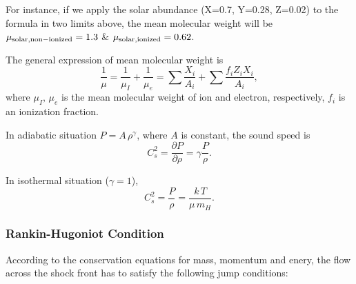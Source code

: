 For instance, if we apply the solar abundance (X=0.7, Y=0.28, Z=0.02) to the formula in two limits above,
the mean molecular weight will be $\mu_{\rm solar,non-ionized}=1.3$ \& $\mu_{\rm solar,ionized} =0.62$.

The general expression of mean molecular weight is
\begin{equation}
    \frac{1}{\mu} = \frac{1}{\mu_{I}} + \frac{1}{\mu_{e}} = \sum\frac{X_{i}}{A_{i}} + \sum\frac{f_{i}Z_{i}X_{i}}{A_{i}},
\end{equation}
where $\mu_{I},\,\mu_{e}$ is the mean molecular weight of ion and electron, respectively, $f_{i}$ is an ionization fraction.


\medskip
{}

In adiabatic situation $P = A\, \rho^{\gamma}$, where $A$ is constant, the sound speed is
\begin{equation}
    C_{s}^{2} = \frac{\partial P}{\partial \rho} = \gamma \frac{P}{\rho}.
\end{equation}

In isothermal situation ($\gamma=1$),
\begin{equation}
    C_{s}^{2} = \frac{P}{\rho} = \frac{k\,T}{\mu\,m_{H}}.
\end{equation}


\subsubsection{Rankin-Hugoniot Condition}
According to the conservation equations for mass, momentum and enery, the flow across
the shock front has to satisfy the following jump conditions:

